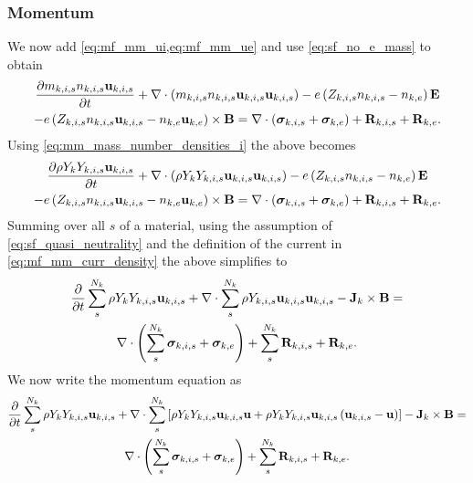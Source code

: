 \documentclass[a4paper,11pt]{report}
\begin{document}
\subsubsection{Momentum}

We now add \cref{eq:mf_mm_ui,eq:mf_mm_ue} and use \cref{eq:sf_no_e_mass} to obtain
\begin{multline*}
    \frac{\partial m_{k,i,s} n_{k,i,s} \mathbf{u}_{k,i,s}}{\partial t} + \nabla \cdot \left( m_{k,i,s} n_{k,i,s} \mathbf{u}_{k,i,s} \mathbf{u}_{k,i,s} \right) -e \left( Z_{k,i,s} n_{k,i,s} - n_{k,e} \right) \mathbf{E} \\
    - e \left( Z_{k,i,s} n_{k,i,s} \mathbf{u}_{k,i,s} - n_{k,e} \mathbf{u}_{k,e} \right) \times \mathbf{B} = \nabla \cdot \left( \bm \sigma_{k,i,s} + \bm \sigma_{k,e} \right) + \mathbf{R}_{k,i,s} + \mathbf{R}_{k,e}.
\end{multline*}
Using \cref{eq:mm_mass_number_densities_i} the above becomes
\begin{multline*}
    \frac{\partial \rho Y_k Y_{k,i,s} \mathbf{u}_{k,i,s}}{\partial t} + \nabla \cdot \left( \rho Y_k Y_{k,i,s} \mathbf{u}_{k,i,s} \mathbf{u}_{k,i,s} \right) -e \left( Z_{k,i,s} n_{k,i,s} - n_{k,e} \right) \mathbf{E} \\
    - e \left( Z_{k,i,s} n_{k,i,s} \mathbf{u}_{k,i,s} - n_{k,e} \mathbf{u}_{k,e} \right) \times \mathbf{B} = \nabla \cdot \left( \bm \sigma_{k,i,s} + \bm \sigma_{k,e} \right) + \mathbf{R}_{k,i,s} + \mathbf{R}_{k,e}.
\end{multline*}
Summing over all $s$ of a material, using the assumption of \cref{eq:sf_quasi_neutrality} and the definition of the current in \cref{eq:mf_mm_curr_density} the above simplifies to
\begin{multline*}
    \frac{\partial}{\partial t} \sum_s^{N_k} \rho Y_k Y_{k,i,s} \mathbf{u}_{k,i,s} + \nabla \cdot \sum_s^{N_k} \rho Y_{k,i,s} \mathbf{u}_{k,i,s} \mathbf{u}_{k,i,s} - \mathbf{J}_k \times \mathbf{B} = \\
    \nabla \cdot \left( \sum_s^{N_k} \bm \sigma_{k,i,s} + \bm \sigma_{k,e} \right) + \sum_s^{N_k} \mathbf{R}_{k,i,s} + \mathbf{R}_{k,e}.
\end{multline*}
We now write the momentum equation as
\begin{multline*}
    \frac{\partial}{\partial t} \sum_s^{N_k} \rho Y_k Y_{k,i,s} \mathbf{u}_{k,i,s} + \nabla \cdot \sum_s^{N_k} \left[ \rho Y_k Y_{k,i,s} \mathbf{u}_{k,i,s} \mathbf{u} + \rho Y_k Y_{k,i,s} \mathbf{u}_{k,i,s} \left( \mathbf{u}_{k,i,s} - \mathbf{u} \right) \right] - \mathbf{J}_k \times \mathbf{B} = \\
    \nabla \cdot \left( \sum_s^{N_k} \bm \sigma_{k,i,s} + \bm \sigma_{k,e} \right) + \sum_s^{N_k} \mathbf{R}_{k,i,s} + \mathbf{R}_{k,e}.
\end{multline*}
\end{document}
